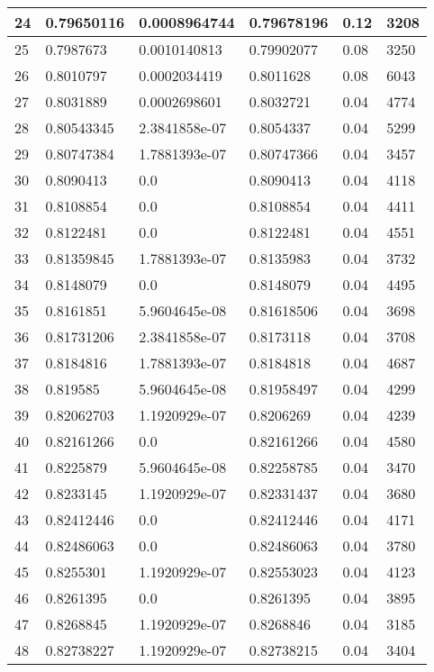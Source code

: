 \begin{longtable}{|l|l|l|l|l|l|}
24 & 0.79650116 & 0.0008964744 & 0.79678196 & 0.12 & 3208 \\ \hline 
25 & 0.7987673 & 0.0010140813 & 0.79902077 & 0.08 & 3250 \\ \hline 
26 & 0.8010797 & 0.0002034419 & 0.8011628 & 0.08 & 6043 \\ \hline 
27 & 0.8031889 & 0.0002698601 & 0.8032721 & 0.04 & 4774 \\ \hline 
28 & 0.80543345 & 2.3841858e-07 & 0.8054337 & 0.04 & 5299 \\ \hline 
29 & 0.80747384 & 1.7881393e-07 & 0.80747366 & 0.04 & 3457 \\ \hline 
30 & 0.8090413 & 0.0 & 0.8090413 & 0.04 & 4118 \\ \hline 
31 & 0.8108854 & 0.0 & 0.8108854 & 0.04 & 4411 \\ \hline 
32 & 0.8122481 & 0.0 & 0.8122481 & 0.04 & 4551 \\ \hline 
33 & 0.81359845 & 1.7881393e-07 & 0.8135983 & 0.04 & 3732 \\ \hline 
34 & 0.8148079 & 0.0 & 0.8148079 & 0.04 & 4495 \\ \hline 
35 & 0.8161851 & 5.9604645e-08 & 0.81618506 & 0.04 & 3698 \\ \hline 
36 & 0.81731206 & 2.3841858e-07 & 0.8173118 & 0.04 & 3708 \\ \hline 
37 & 0.8184816 & 1.7881393e-07 & 0.8184818 & 0.04 & 4687 \\ \hline 
38 & 0.819585 & 5.9604645e-08 & 0.81958497 & 0.04 & 4299 \\ \hline 
39 & 0.82062703 & 1.1920929e-07 & 0.8206269 & 0.04 & 4239 \\ \hline 
40 & 0.82161266 & 0.0 & 0.82161266 & 0.04 & 4580 \\ \hline 
41 & 0.8225879 & 5.9604645e-08 & 0.82258785 & 0.04 & 3470 \\ \hline 
42 & 0.8233145 & 1.1920929e-07 & 0.82331437 & 0.04 & 3680 \\ \hline 
43 & 0.82412446 & 0.0 & 0.82412446 & 0.04 & 4171 \\ \hline 
44 & 0.82486063 & 0.0 & 0.82486063 & 0.04 & 3780 \\ \hline 
45 & 0.8255301 & 1.1920929e-07 & 0.82553023 & 0.04 & 4123 \\ \hline 
46 & 0.8261395 & 0.0 & 0.8261395 & 0.04 & 3895 \\ \hline 
47 & 0.8268845 & 1.1920929e-07 & 0.8268846 & 0.04 & 3185 \\ \hline 
48 & 0.82738227 & 1.1920929e-07 & 0.82738215 & 0.04 & 3404 \\ \hline 

\end{longtable}
